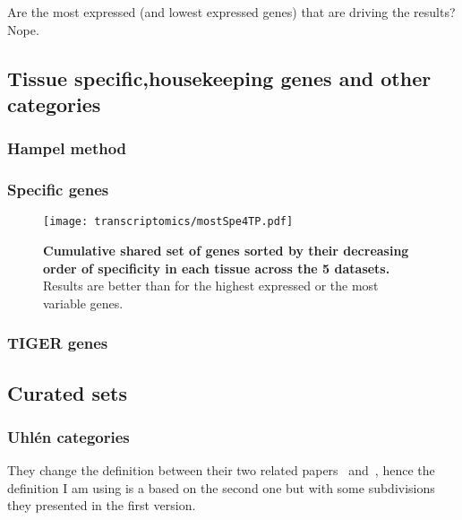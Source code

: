 Are the most expressed (and lowest expressed genes) that are driving the results? Nope.


\subsection{Tissue specific,housekeeping genes and other categories}\label{subsec:Trans_TissueSpeAndHK}

\subsubsection{Hampel method}

\subsubsection{Specific genes}

\begin{figure}[htpb]
    \texttt{[image: transcriptomics/mostSpe4TP.pdf]}\centering
    \caption[Cumulative shared set of genes sorted by their specificity in each
    tissue across the 5 datasets]{\label{fig:mostSpe4T}\textbf{Cumulative shared
    set of genes sorted by their decreasing order of specificity in each tissue
    across the 5 datasets.} Results are better than for the highest expressed or
    the most variable genes.}
\end{figure}

\subsubsection{TIGER genes}




\subsection{Curated sets}\label{subsec:Trans_curatedSets}


\subsubsection{Uhlén categories}

They change the definition between their two related papers~
and~, hence the definition I am using is a based on the second
one but with some subdivisions they presented in the first version.

